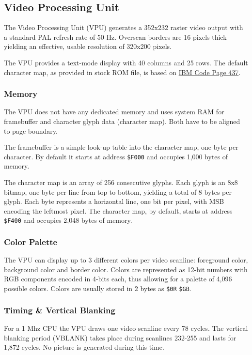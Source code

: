 \documentclass[a4paper,10pt,oneside]{article}
\begin{document}
\subsection{Video Processing Unit}
The Video Processing Unit (VPU) generates a 352x232 raster video output with a standard PAL refresh rate of 50 Hz. Overscan borders are 16 pixels thick yielding an effective, usable resolution of 320x200 pixels.

The VPU provides a text-mode display with 40 columns and 25 rows. The default character map, as provided in stock ROM file, is based on \href{http://en.wikipedia.org/wiki/Code_page_437}{IBM Code Page 437}.

\subsubsection*{Memory}
The VPU does not have any dedicated memory and uses system RAM for framebuffer and character glyph data (character map). Both have to be aligned to page boundary.

The framebuffer is a simple look-up table into the character map, one byte per character. By default it starts at address \texttt{\$F000} and occupies 1,000 bytes of memory.

The character map is an array of 256 consecutive glyphs. Each glyph is an 8x8 bitmap, one byte per line from top to bottom, yielding a total of 8 bytes per glyph. Each byte represents a horizontal line, one bit per pixel, with MSB encoding the leftmost pixel. The character map, by default, starts at address \texttt{\$F400} and occupies 2,048 bytes of memory.

\subsubsection*{Color Palette}
The VPU can display up to 3 different colors per video scanline: foreground color, background color and border color. Colors are represented as 12-bit numbers with RGB components encoded in 4-bits each, thus allowing for a palette of 4,096 possible colors. Colors are usually stored in 2 bytes as \texttt{\$0R} \texttt{\$GB}.

\subsubsection*{Timing \& Vertical Blanking}
For a 1 Mhz CPU the VPU draws one video scanline every 78 cycles. The vertical blanking period (VBLANK) takes place during scanlines 232-255 and lasts for 1,872 cycles. No picture is generated during this time.
\end{document}
